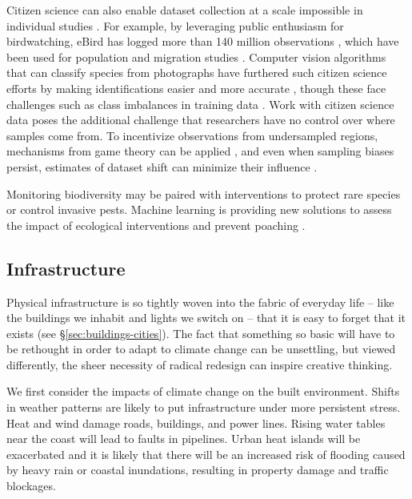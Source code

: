 \documentclass[11pt]{report}
\begin{document}
Citizen science can also enable dataset collection at a scale impossible in individual studies \cite{sullivan2009ebird, plantsnap, branchini2015using, menon2016animal}. For example, by leveraging public enthusiasm for birdwatching, eBird has logged more than 140 million observations \cite{sullivan2009ebird}, which have been used for population and migration studies \cite{kelly2016novel}. Computer vision algorithms that can classify species from photographs have furthered such citizen science efforts by making identifications easier and more accurate \cite{van2015building, ralls2018systems}, though these face challenges such as class imbalances in training data \cite{van2017devil}. Work with citizen science data poses the additional challenge that researchers have no control over where samples come from. To incentivize observations from undersampled regions, mechanisms from game theory can be applied \cite{xue2016avicaching}, and even when sampling biases persist, estimates of dataset shift can minimize their influence \cite{chen2018bias}.

Monitoring biodiversity may be paired with interventions to protect rare species or control invasive pests. Machine learning is providing new solutions to assess the impact of ecological interventions \cite{rana2018machine, albers2018role, lydakiscomputing} and prevent poaching \cite{xue2016avicaching}.

\subsection{Infrastructure} \label{subsub:infrastructure}

Physical infrastructure is so tightly woven into the fabric of everyday life -- like the buildings we inhabit and lights we switch on -- that it is easy to forget that it exists (see \S\ref{sec:buildings-cities}). The fact that something so basic will have to be rethought in order to adapt to climate change can be unsettling, but viewed differently, the sheer necessity of radical redesign can inspire creative thinking.

We first consider the impacts of climate change on the built environment. Shifts in weather patterns are likely to put infrastructure under more persistent stress. Heat and wind damage roads, buildings, and power lines. Rising water tables near the coast will lead to faults in pipelines. Urban heat islands will be exacerbated and it is likely that there will be an increased risk of flooding caused by heavy rain or coastal inundations, resulting in property damage and traffic blockages\cite{Pachauri2014}.
\end{document}
